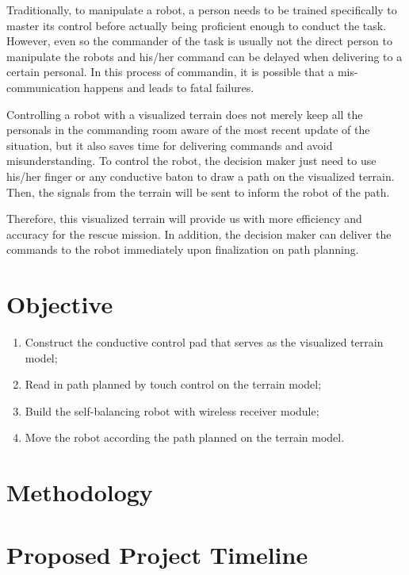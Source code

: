\documentclass[a4paper,12pt]{article}
\begin{document}
Traditionally, to manipulate a robot, a person needs to be trained specifically to master its control before actually being proficient enough to conduct the task. However, even so the commander of the task is usually not the direct person to manipulate the robots and his/her command can be delayed when delivering to a certain personal. In this process of commandin, it is possible that a mis-communication happens and leads to fatal failures.

Controlling a robot with a visualized terrain does not merely keep all the personals in the commanding room aware of the most recent update of the situation, but it also saves time for delivering commands and avoid misunderstanding. To control the robot, the decision maker just need to use his/her finger or any conductive baton to draw a path on the visualized terrain. Then, the signals from the terrain will be sent to inform the robot of the path. 

Therefore, this visualized terrain will provide us with more efficiency and accuracy for the rescue mission. In addition, the decision maker can deliver the commands to the robot immediately upon finalization on path planning.

\section{Objective}

\begin{enumerate}
	\item Construct the conductive control pad that serves as the visualized terrain model;
	\item Read in path planned by touch control on the terrain model; 
	\item Build the self-balancing robot with wireless receiver module;
	\item Move the robot according the path planned on the terrain model.
\end{enumerate}


\section{Methodology}



\section{Proposed Project Timeline}
\end{document}
